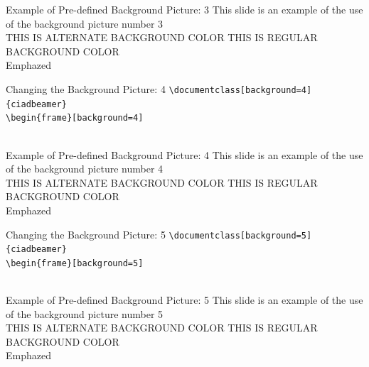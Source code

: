 \documentclass[english,sectioncirclenumberstyle]{ciadbeamer}
\begin{document}
\begin{frame}[background=3]{Example of Pre-defined Background Picture: 3}
	This slide is an example of the use of the background picture number 3 \\[.5cm]
	\ifbeamerthemeciadalternatebgcolor%
		THIS IS ALTERNATE BACKGROUND COLOR%
	\else%
		THIS IS REGULAR BACKGROUND COLOR%
	\fi\\[.5cm]%
	Emphazed 
\end{frame}

\begin{frame}[t]{{Changing the Background Picture:} 4}
	\texttt{{\textbackslash}documentclass[background=4]\{ciadbeamer\}} \\[.25cm]
	\texttt{{\textbackslash}begin\{frame\}[background=4]} \\[.25cm]
	\centering{} \\[.25cm]
\end{frame}

\begin{frame}[background=4]{Example of Pre-defined Background Picture: 4}
	This slide is an example of the use of the background picture number 4 \\[.5cm]
	\ifbeamerthemeciadalternatebgcolor%
		THIS IS ALTERNATE BACKGROUND COLOR%
	\else%
		THIS IS REGULAR BACKGROUND COLOR%
	\fi\\[.5cm]%
	Emphazed 
\end{frame}

\begin{frame}[t]{{Changing the Background Picture:} 5}
	\texttt{{\textbackslash}documentclass[background=5]\{ciadbeamer\}} \\[.25cm]
	\texttt{{\textbackslash}begin\{frame\}[background=5]} \\[.25cm]
	\centering{} \\[.25cm]
\end{frame}

\begin{frame}[background=5]{Example of Pre-defined Background Picture: 5}
	This slide is an example of the use of the background picture number 5 \\[.5cm]
	\ifbeamerthemeciadalternatebgcolor%
		THIS IS ALTERNATE BACKGROUND COLOR%
	\else%
		THIS IS REGULAR BACKGROUND COLOR%
	\fi\\[.5cm]%
	Emphazed 
\end{frame}
\end{document}
